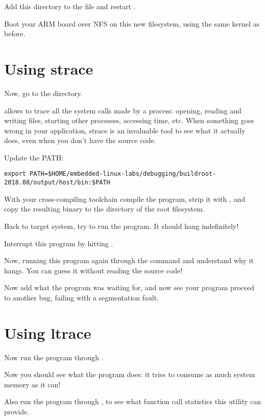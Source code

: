 Add this directory to the  file and restart
.

Boot your ARM board over NFS on this new filesystem, using the same
kernel as before.

\section{Using strace}

Now, go to the  directory.

 allows to trace all the system calls made by a process:
opening, reading and writing files, starting other processes,
accessing time, etc. When something goes wrong in your application,
strace is an invaluable tool to see what it actually does, even when
you don't have the source code.


Update the PATH:
\footnotesize
\begin{verbatim}
export PATH=$HOME/embedded-linux-labs/debugging/buildroot-2018.08/output/host/bin:$PATH
\end{verbatim}
\normalsize

With your cross-compiling toolchain
compile the  program, strip it with
, and copy the resulting binary to the
 directory of the root filesystem.

Back to target system, try to run the 
program. It should hang indefinitely!

Interrupt this program by hitting \code{[Ctrl] [C]}.

Now, running this program again through the  command and
understand why it hangs. You can guess it without reading the source
code!

Now add what the program was waiting for, and now see your program
proceed to another bug, failing with a segmentation fault.

\section{Using ltrace}

Now run the program through .

Now you should see what the program does: it tries to consume as much
system memory as it can!

Also run the program through , to see what function call
statistics this utility can provide.

